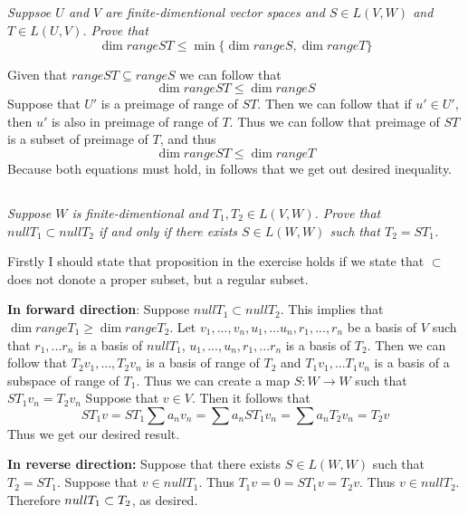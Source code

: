 \documentclass[11pt,oneside,titlepage]{book}
\begin{document}
\subsection{}

\textit{Suppsoe $U$ and $V$ are finite-dimentional vector spaces and $S \in L(V, W)$ and
  $T \in L(U, V)$. Prove that}
$$\dim range ST \leq \min\{\dim range S, \dim range T\}$$

Given that $range ST \subseteq range S$ we can follow that
$$\dim range ST \leq \dim range S$$
Suppose that $U'$ is a preimage of range of $ST$. Then we can follow that if  $u' \in U'$, then
$u'$ is also in preimage of range of $T$. Thus we can follow that preimage of $ST$ is
a subset of preimage of $T$, and thus
$$\dim range ST \leq \dim range T$$
Because both equations must hold, in follows that  we  get out desired inequality.

\subsection{}
\textit{Suppose $W$ is finite-dimentional and $T_1, T_2 \in L(V, W)$. Prove that
  $null T_1 \subset null T_2$ if and only if there exists $S \in L(W, W)$ such that
  $T_2 = ST_1$.}

Firstly I should state that proposition in the exercise holds if we state that
$\subset$ does not donote a proper subset, but a regular subset. 

\textbf{In forward direction}: 
Suppose $null T_1 \subset null T_2$. This implies that $\dim range T_1 \geq \dim range T_2$.
Let $v_1, ..., v_n, u_1, ... u_n, r_1, ..., r_n$ be a basis of $V$ such that
$r_1, ... r_n$ is a basis of $null T_1$,  $u_1, ..., u_n, r_1, ... r_n$ is a basis of $T_2$.
Then we can follow that
$T_2 v_1, ..., T_2 v_n$ is a basis of range of $T_2$ and $T_1 v_1, ... T_1 v_n$ is a
basis of a subspace of range of $T_1$.
Thus we can create a map $S: W \to W$ such that
$S T_1 v_n = T_2 v_n$
Suppose that $v \in V$. Then it follows that
$$S T_1 v = S T_1 \sum a_n v_n =   \sum a_n ST_1 v_n = \sum a_n T_2 v_n = T_2 v$$
Thus we get our desired result.

\textbf{In reverse direction:}
Suppose that there exists $S \in L(W, W)$ such that $T_2 = S T_1$. Suppose that $v \in null T_1$.
Thus $T_1 v = 0 = S T_1 v = T_2 v$. Thus $v \in  null T_2$. Therefore $null T_1 \subset \null T_2$,
as desired.

\subsection{}
\end{document}
